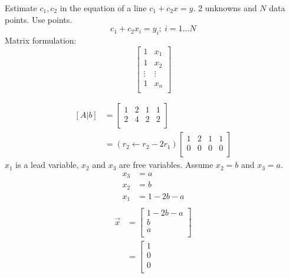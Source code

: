 \documentclass[
	date={August 21{,} 2024}
]{math486notes}
\begin{document}
Estimate $c_{1}, c_{2}$ in the equation of a line $c_{1} + c_{2}x = y$.
2 unknowns and $N$ data points.
Use points.
\[ c_{1} + c_{2}x_{i} = y_{i};\ i = 1\dots{}N \]
Matrix formulation:
\[ \left[ \begin{array}{cc}
	1 & x_{1}\\
	1 & x_{2}\\
	\vdots & \vdots\\
	1 & x_{n}\\
\end{array} \right] \]

\begin{example}
	\begin{equation*}
	\begin{aligned}
		[A | b] &= \left[ \begin{array}{ccc|c}
			1 & 2 & 1 & 1\\
			2 & 4 & 2 & 2\\
		\end{array} \right]\\
	&= (r_{2} \gets r_{2} - 2r_{1})\left[ \begin{array}{ccc|c}
			1 & 2 & 1 & 1\\
			0 & 0 & 0 & 0\\
		\end{array} \right]
	\end{aligned}
	\end{equation*}
	$x_{1}$ is a lead variable, $x_{2}$ and $x_{3}$ are free variables.
	Assume $x_{2}=b$ and $x_{3}=a$.
	\begin{equation*}
	\begin{aligned}
		x_{3} &= a\\
		x_{2} &= b\\
		x_{1} &= 1 - 2b - a\\
	\end{aligned}
	\end{equation*}
	\begin{equation*}
	\begin{aligned}
		\vec{x} &= \left[ \begin{array}{c}
			1 - 2b - a\\
			b\\
			a\\
		\end{array} \right]\\
		&= \left[ \begin{array}{c}
			1\\
			0\\
			0\\

\end{array}
\end{aligned}
\end{equation*}
\end{example}
\end{document}
